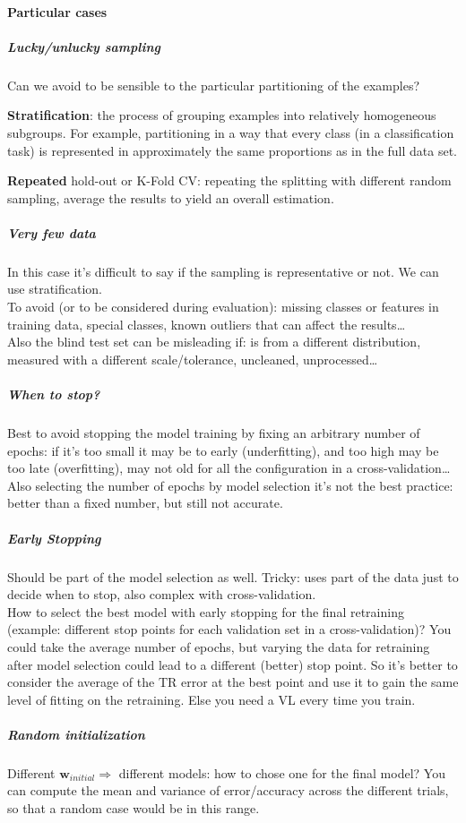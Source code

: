 \documentclass[10pt]{report}
\begin{document}
\paragraph{Particular cases} 
\subparagraph{Lucky/unlucky sampling} Can we avoid to be sensible to the particular partitioning of the examples?
\begin{list}{}{}
	\item \textbf{Stratification}: the process of grouping examples into relatively homogeneous subgroups. For example, partitioning in a way that every class (in a classification task) is represented in approximately the same proportions as in the full data set.
	\item  \textbf{Repeated} hold-out or K-Fold CV: repeating the splitting with different random sampling, average the results to yield an overall estimation.
\end{list}
\subparagraph{Very few data} In this case it's difficult to say if the sampling is representative or not. We can use stratification.\\
To avoid (or to be considered during evaluation): missing classes or features in training data, special classes, known outliers that can affect the results\ldots\\
Also the blind test set can be misleading if: is from a different distribution, measured with a different scale/tolerance, uncleaned, unprocessed\ldots
\subparagraph{When to stop?} Best to avoid stopping the model training by fixing an arbitrary number of epochs: if it's too small it may be to early (underfitting), and too high may be too late (overfitting), may not old for all the configuration in a cross-validation\ldots\\
Also selecting the number of epochs by model selection it's not the best practice: better than a fixed number, but still not accurate.
\subparagraph{Early Stopping} Should be part of the model selection as well. Tricky: uses part of the data just to decide when to stop, also complex with cross-validation.\\
How to select the best model with early stopping for the final retraining (example: different stop points for each validation set in a cross-validation)? You could take the average number of epochs, but varying the data for retraining after model selection could lead to a different (better) stop point. So it's better to consider the average of the TR error at the best point and use it to gain the same level of fitting on the retraining. Else you need a VL every time you train.
\subparagraph{Random initialization} Different $\mathbf{w}_{initial} \Rightarrow$ different models: how to chose one for the final model? You can compute the mean and variance of error/accuracy across the different trials, so that a random case would be in this range.
\end{document}
